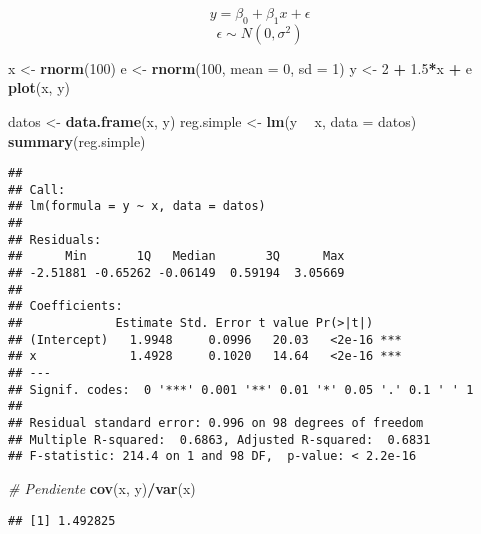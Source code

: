 \documentclass[
]{book}
\newenvironment{Shaded}{\begin{snugshade}}{\end{snugshade}}
\newcommand{\CommentTok}[1]{\textcolor[rgb]{0.56,0.35,0.01}{\textit{#1}}}
\newcommand{\DataTypeTok}[1]{\textcolor[rgb]{0.13,0.29,0.53}{#1}}
\newcommand{\DecValTok}[1]{\textcolor[rgb]{0.00,0.00,0.81}{#1}}
\newcommand{\FloatTok}[1]{\textcolor[rgb]{0.00,0.00,0.81}{#1}}
\newcommand{\KeywordTok}[1]{\textcolor[rgb]{0.13,0.29,0.53}{\textbf{#1}}}
\newcommand{\NormalTok}[1]{#1}
\newcommand{\OperatorTok}[1]{\textcolor[rgb]{0.81,0.36,0.00}{\textbf{#1}}}
\newcommand{\StringTok}[1]{\textcolor[rgb]{0.31,0.60,0.02}{#1}}
\begin{document}
\[y = \beta_0 + \beta_1 x + \epsilon\]
\[\epsilon \sim N(0, \sigma^2)\]

\begin{Shaded}
\begin{Highlighting}[]
\NormalTok{x <-}\StringTok{ }\KeywordTok{rnorm}\NormalTok{(}\DecValTok{100}\NormalTok{)}
\NormalTok{e <-}\StringTok{ }\KeywordTok{rnorm}\NormalTok{(}\DecValTok{100}\NormalTok{, }\DataTypeTok{mean =} \DecValTok{0}\NormalTok{, }\DataTypeTok{sd =} \DecValTok{1}\NormalTok{)}
\NormalTok{y <-}\StringTok{ }\DecValTok{2} \OperatorTok{+}\StringTok{ }\FloatTok{1.5}\OperatorTok{*}\NormalTok{x }\OperatorTok{+}\StringTok{ }\NormalTok{e}
\KeywordTok{plot}\NormalTok{(x, y)}

\NormalTok{datos <-}\StringTok{ }\KeywordTok{data.frame}\NormalTok{(x, y)}
\NormalTok{reg.simple <-}\StringTok{ }\KeywordTok{lm}\NormalTok{(y }\OperatorTok{~}\StringTok{ }\NormalTok{x, }\DataTypeTok{data =}\NormalTok{ datos)}
\KeywordTok{summary}\NormalTok{(reg.simple)}
\end{Highlighting}
\end{Shaded}

\begin{verbatim}
## 
## Call:
## lm(formula = y ~ x, data = datos)
## 
## Residuals:
##      Min       1Q   Median       3Q      Max 
## -2.51881 -0.65262 -0.06149  0.59194  3.05669 
## 
## Coefficients:
##             Estimate Std. Error t value Pr(>|t|)    
## (Intercept)   1.9948     0.0996   20.03   <2e-16 ***
## x             1.4928     0.1020   14.64   <2e-16 ***
## ---
## Signif. codes:  0 '***' 0.001 '**' 0.01 '*' 0.05 '.' 0.1 ' ' 1
## 
## Residual standard error: 0.996 on 98 degrees of freedom
## Multiple R-squared:  0.6863, Adjusted R-squared:  0.6831 
## F-statistic: 214.4 on 1 and 98 DF,  p-value: < 2.2e-16
\end{verbatim}

\begin{Shaded}
\begin{Highlighting}[]
\CommentTok{# Pendiente}
\KeywordTok{cov}\NormalTok{(x, y)}\OperatorTok{/}\KeywordTok{var}\NormalTok{(x) }
\end{Highlighting}
\end{Shaded}

\begin{verbatim}
## [1] 1.492825
\end{verbatim}

\begin{Shaded}
\end{Shaded}
\end{document}
